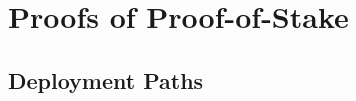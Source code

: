 \chapter{Proofs of Proof-of-Stake}\label{chapter:stake}




\cite{pos-sidechains}

\section{Deployment Paths}

